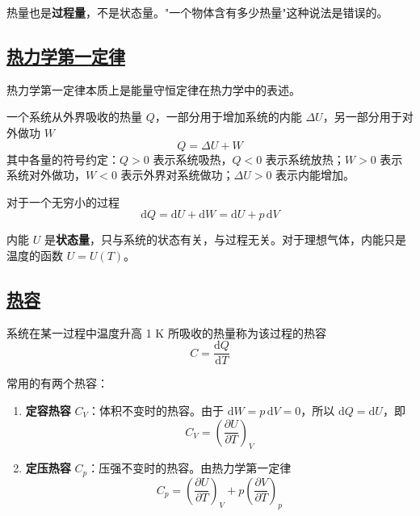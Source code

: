 \begin{remark}
    热量也是\textbf{过程量}，不是状态量。"一个物体含有多少热量"这种说法是错误的。
\end{remark}

\subsection{\protect\hyperlink{:}{热力学第一定律}}

热力学第一定律本质上是能量守恒定律在热力学中的表述。

\begin{theorem}[热力学第一定律]
    一个系统从外界吸收的热量 $Q$，一部分用于增加系统的内能 $\Delta U$，另一部分用于对外做功 $W$
    \begin{equation}
        Q = \Delta U + W
    \end{equation}
    其中各量的符号约定：$Q > 0$ 表示系统吸热，$Q < 0$ 表示系统放热；$W > 0$ 表示系统对外做功，$W < 0$ 表示外界对系统做功；$\Delta U > 0$ 表示内能增加。
\end{theorem}

对于一个无穷小的过程
\begin{equation}
    \mathrm{d}Q = \mathrm{d}U + \mathrm{d}W = \mathrm{d}U + p\,\mathrm{d}V
\end{equation}

\begin{remark}
    内能 $U$ 是\textbf{状态量}，只与系统的状态有关，与过程无关。对于理想气体，内能只是温度的函数 $U = U(T)$。
\end{remark}

\subsection{\protect\hyperlink{:}{热容}}

\begin{definition}[热容]
    系统在某一过程中温度升高 1 K 所吸收的热量称为该过程的热容
    \begin{equation}
        C = \frac{\mathrm{d}Q}{\mathrm{d}T}
    \end{equation}
\end{definition}

常用的有两个热容：
\begin{enumerate}
    \item \textbf{定容热容} $C_V$：体积不变时的热容。由于 $\mathrm{d}W = p\,\mathrm{d}V = 0$，所以 $\mathrm{d}Q = \mathrm{d}U$，即
    \begin{equation}
        C_V = \left(\frac{\partial U}{\partial T}\right)_V
    \end{equation}
    \item \textbf{定压热容} $C_p$：压强不变时的热容。由热力学第一定律
    \begin{equation}
        C_p = \left(\frac{\partial U}{\partial T}\right)_V + p\left(\frac{\partial V}{\partial T}\right)_p
    \end{equation}
\end{enumerate}

